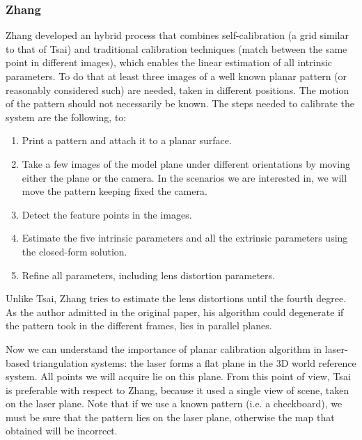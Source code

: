 \subsubsection{Zhang}
Zhang developed an hybrid process that combines self-calibration (a grid similar to that of Tsai) and traditional calibration techniques (match between the same point in different images), which enables the linear estimation of all intrinsic parameters. To do that at least three images of a well known planar pattern (or reasonably considered such) are needed, taken in different positions. The motion of the pattern should not necessarily be known. The steps needed to calibrate the system are the following, to:
  \begin{enumerate}
    \item Print a pattern and attach it to a planar surface.
    \item Take a few images of the model plane under different orientations by moving either the plane or the camera. In the scenarios we are interested in, we will move the pattern keeping fixed the camera.
    \item Detect the feature points in the images.
    \item Estimate the five intrinsic parameters and all the extrinsic parameters using the closed-form solution.
    \item Refine all parameters, including lens distortion parameters.
  \end{enumerate}
Unlike Tsai, Zhang tries to estimate the lens distortions until the fourth degree. As the author admitted in the original paper, his algorithm could degenerate if the pattern took in the different frames, lies in parallel planes.

\bigskip
Now we can understand the importance of planar calibration algorithm in laser-based triangulation systems: the laser forms a flat plane in the 3D world reference system. All points we will acquire lie on this plane. From this point of view, Tsai is preferable with respect to Zhang, because it used a single view of scene, taken on the laser plane. Note that if we use a known pattern (i.e. a checkboard), we must be sure that the pattern lies on the laser plane, otherwise the map that obtained will be incorrect.
